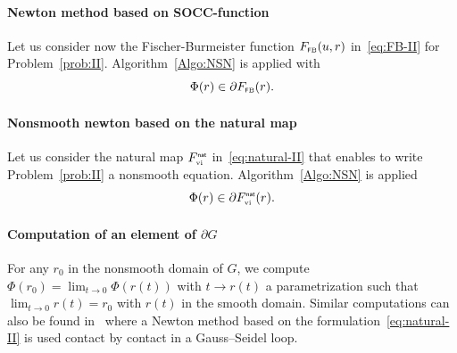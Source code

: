 \paragraph{Newton method based on  SOCC-function}
\label{Sec:Num-SOCCP}
Let us consider now the Fischer-Burmeister function $F_{{\hbox{\tiny{\textsf FB}}}}(u,r)$ in~\eqref{eq:FB-II} for Problem~\ref{prob:II}.
Algorithm~\ref{Algo:NSN} is applied {with}
\begin{equation}  \label{eq:phiphi-soccp}
    \Phi(r) \in \partial F_{\fb}(r).
\end{equation}

\paragraph{Nonsmooth newton based on the natural map }
Let us consider the natural map $F_{{\hbox{\tiny{vi}}}}^{\hbox{\sf \tiny{nat}}}$ in~\eqref{eq:natural-II} that enables to write Problem~\ref{prob:II}  a nonsmooth equation.
Algorithm~\ref{Algo:NSN} is applied 
\begin{equation}  \label{eq:phiphi}
    \Phi(r) \in \partial F_{\vitwo}^\nat(r).
\end{equation}

\paragraph{Computation of an element of $\partial G$}

For any $r_0$ in the nonsmooth domain of $G$, we compute $\Phi(r_0) = \lim_{t\to0}\Phi(r(t))$ with $t \to r(t)$ a parametrization such that $\lim_{t\to0}r(t) = r_0$ with $r(t)$ in the smooth domain. 
Similar computations can also be found in~\cite{Joli.Feng2008} where a Newton method based on the formulation~\eqref{eq:natural-II} is used contact by contact in a Gauss--Seidel loop.





